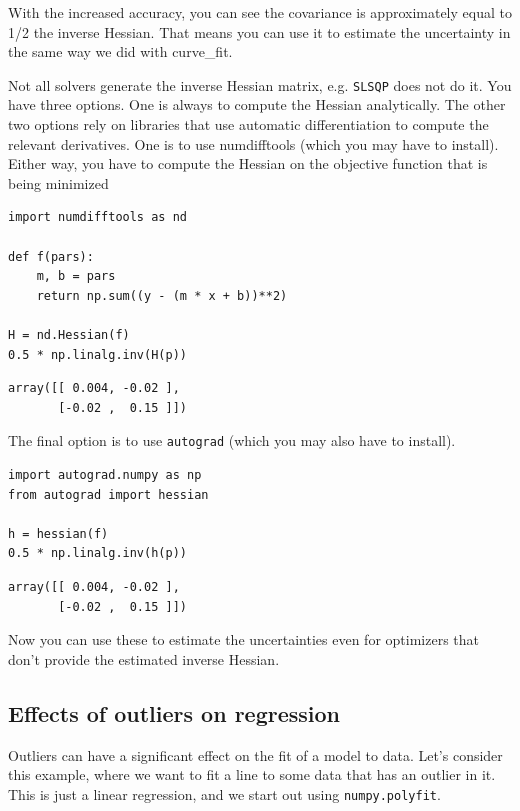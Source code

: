 \documentclass[11pt]{article}
\begin{document}
With the increased accuracy, you can see the covariance is approximately equal to 1/2 the inverse Hessian. That means you can use it to estimate the uncertainty in the same way we did with curve\_fit.

Not all solvers generate the inverse Hessian matrix, e.g. \texttt{SLSQP} does not do it. You have three options. One is always to compute the Hessian analytically. The other two options rely on libraries that use automatic differentiation to compute the relevant derivatives. One is to use numdifftools (which you may have to install). Either way, you have to compute the Hessian on the objective function that is being minimized

\begin{verbatim}
import numdifftools as nd

def f(pars):
    m, b = pars
    return np.sum((y - (m * x + b))**2)

H = nd.Hessian(f)
0.5 * np.linalg.inv(H(p))
\end{verbatim}

\begin{verbatim}
array([[ 0.004, -0.02 ],
       [-0.02 ,  0.15 ]])
\end{verbatim}


The final option is to use \texttt{autograd} (which you may also have to install).

\begin{verbatim}
import autograd.numpy as np
from autograd import hessian

h = hessian(f)
0.5 * np.linalg.inv(h(p))
\end{verbatim}

\begin{verbatim}
array([[ 0.004, -0.02 ],
       [-0.02 ,  0.15 ]])
\end{verbatim}

Now you can use these to estimate the uncertainties even for optimizers that don't provide the estimated inverse Hessian.

\subsection{Effects of outliers on regression}
\label{sec:orgc8ee8da}

Outliers can have a significant effect on the fit of a model to data. Let's consider this example, where we want to fit a line to some data that has an outlier in it. This is just a linear regression, and we start out using \texttt{numpy.polyfit}.
\end{document}
